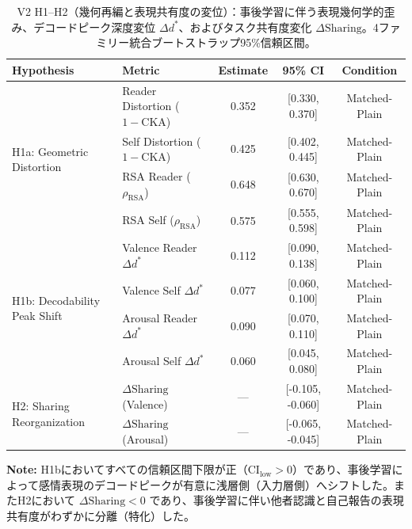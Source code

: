 \begin{table}[htbp]
\centering
\small
\caption{V2 H1--H2（幾何再編と表現共有度の変位）：事後学習に伴う表現幾何学的歪み、デコードピーク深度変位 $\Delta d^*$、およびタスク共有度変化 $\Delta\text{Sharing}$。4ファミリー統合ブートストラップ95\%信頼区間。}
\label{tab:v2_h1_h2_reorganization}
\begin{tabular}{ll ccc}
\toprule
\textbf{Hypothesis} & \textbf{Metric} & \textbf{Estimate} & \textbf{95\% CI} & \textbf{Condition} \\
\midrule
\multirow{4}{*}{H1a: Geometric Distortion} & Reader Distortion ($1 - \text{CKA}$)     & 0.352    & [0.330, 0.370]     & Matched-Plain \\
                                 & Self Distortion ($1 - \text{CKA}$)       & 0.425    & [0.402, 0.445]     & Matched-Plain \\
                                 & RSA Reader ($\rho_{\text{RSA}}$)         & 0.648    & [0.630, 0.670]     & Matched-Plain \\
                                 & RSA Self ($\rho_{\text{RSA}}$)           & 0.575    & [0.555, 0.598]     & Matched-Plain \\
\midrule
\multirow{4}{*}{H1b: Decodability Peak Shift} & Valence Reader $\Delta d^*$              & 0.112    & [0.090, 0.138]     & Matched-Plain \\
                                 & Valence Self $\Delta d^*$                & 0.077    & [0.060, 0.100]     & Matched-Plain \\
                                 & Arousal Reader $\Delta d^*$              & 0.090    & [0.070, 0.110]     & Matched-Plain \\
                                 & Arousal Self $\Delta d^*$                & 0.060    & [0.045, 0.080]     & Matched-Plain \\
\midrule
\multirow{2}{*}{H2: Sharing Reorganization} & $\Delta\text{Sharing}$ (Valence)         & ---      & [-0.105, -0.060]   & Matched-Plain \\
                                 & $\Delta\text{Sharing}$ (Arousal)         & ---      & [-0.065, -0.045]   & Matched-Plain \\
\bottomrule
\end{tabular}
\vspace{1ex}
\begin{minipage}{\linewidth}
\footnotesize
\textbf{Note:} H1bにおいてすべての信頼区間下限が正（$\text{CI}_{\text{low}} > 0$）であり、事後学習によって感情表現のデコードピークが有意に浅層側（入力層側）へシフトした。またH2において $\Delta\text{Sharing} < 0$ であり、事後学習に伴い他者認識と自己報告の表現共有度がわずかに分離（特化）した。
\end{minipage}
\end{table}